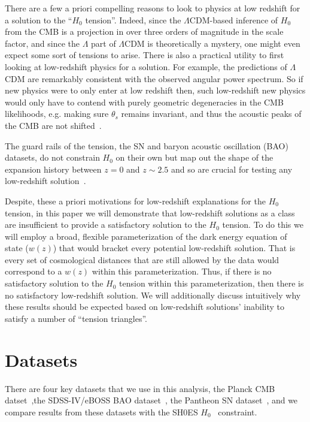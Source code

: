 \documentclass[
 reprint,
 amsmath,amssymb,
 aps,
]{revtex4-2}
\begin{document}
There are a few a priori compelling reasons to look to physics at low redshift for a solution to the ``$H_0$ tension''.  Indeed, since the $\Lambda$CDM-based inference of $H_0$ from the CMB is a projection in over three orders of magnitude in the scale factor, and since the $\Lambda$ part of $\Lambda$CDM is theoretically a mystery, one might even expect some sort of tensions to arise. There is also a practical utility to first looking at low-redshift physics for a solution. For example, 
the predictions of $\Lambda$CDM are remarkably consistent with the observed angular power spectrum.  So if new physics were to only enter at low redshift then, such low-redshift new physics would only have to contend with purely geometric degeneracies in the CMB likelihoods,  e.g. making sure $\theta_s$ remains invariant, and thus the acoustic peaks of the CMB are not shifted~\cite{2018PhRvD..97l3501J,Knox:2019rjx}.

The guard rails of the tension, the SN and baryon acoustic oscillation (BAO) datasets, do not constrain $H_0$ on their own but map out the shape of the expansion history between $z=0$ and $z\sim 2.5$ and so are crucial for testing any low-redshift solution~\cite{Keeley:2020aym}.

Despite, these a priori motivations for low-redshift explanations for the $H_0 $ tension, in this paper we will demonstrate that low-redshift solutions as a class are insufficient to provide a satisfactory solution to the $H_0$ tension. To do this we will employ a broad, flexible parameterization of the dark energy equation of state ($w(z)$) that would bracket every potential low-redshift solution.  That is every set of cosmological distances that are still allowed by the data would correspond to a $w(z)$ within this parameterization.  Thus, if there is no satisfactory solution to the $H_0$ tension within this parameterization, then there is no satisfactory low-redshift solution. We will additionally discuss intuitively why these results should be expected based on low-redshift solutions' inability to satisfy a number of ``tension triangles''.


\section{Datasets}
There are four key datasets that we use in this analysis, the Planck CMB datset~\cite{Planck:2018vyg},the SDSS-IV/eBOSS BAO dataset~\cite{eBOSS:2020yzd}, the Pantheon SN dataset~\cite{Pan-STARRS1:2017jku}, and we compare results from these datasets with the SH0ES $H_0$~\cite{Riess:2021jrx} constraint.
\end{document}
